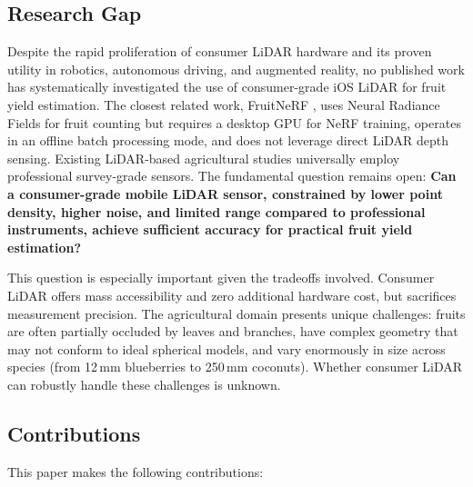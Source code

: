 \documentclass[12pt,a4paper]{article}
\begin{document}
\subsection{Research Gap}

Despite the rapid proliferation of consumer LiDAR hardware and its proven utility in robotics, autonomous driving, and augmented reality, no published work has systematically investigated the use of consumer-grade iOS LiDAR for fruit yield estimation. The closest related work, FruitNeRF \citep{meyer-2024}, uses Neural Radiance Fields for fruit counting but requires a desktop GPU for NeRF training, operates in an offline batch processing mode, and does not leverage direct LiDAR depth sensing. Existing LiDAR-based agricultural studies \citep{gene-mola-2020, underwood-2016, reiser-2018} universally employ professional survey-grade sensors. The fundamental question remains open: \textbf{Can a consumer-grade mobile LiDAR sensor, constrained by lower point density, higher noise, and limited range compared to professional instruments, achieve sufficient accuracy for practical fruit yield estimation?}

This question is especially important given the tradeoffs involved. Consumer LiDAR offers mass accessibility and zero additional hardware cost, but sacrifices measurement precision. The agricultural domain presents unique challenges: fruits are often partially occluded by leaves and branches, have complex geometry that may not conform to ideal spherical models, and vary enormously in size across species (from 12\,mm blueberries to 250\,mm coconuts). Whether consumer LiDAR can robustly handle these challenges is unknown.

\subsection{Contributions}

This paper makes the following contributions:
\end{document}
